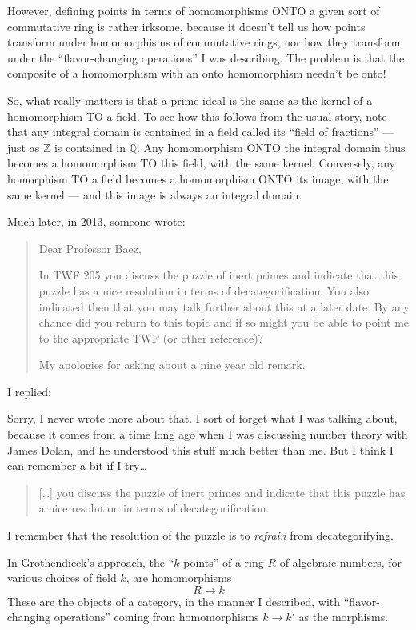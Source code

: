\documentclass{article}
\begin{document}
However, defining points in terms of homomorphisms ONTO a given sort of
commutative ring is rather irksome, because it doesn't tell us how
points transform under homomorphisms of commutative rings, nor how they
transform under the ``flavor-changing operations'' I was describing. The
problem is that the composite of a homomorphism with an onto
homomorphism needn't be onto!

So, what really matters is that a prime ideal is the same as the kernel
of a homomorphism TO a field. To see how this follows from the usual
story, note that any integral domain is contained in a field called its
``field of fractions'' --- just as \(\mathbb{Z}\) is contained in
\(\mathbb{Q}\). Any homomorphism ONTO the integral domain thus becomes a
homomorphism TO this field, with the same kernel. Conversely, any
homorphism TO a field becomes a homomorphism ONTO its image, with the
same kernel --- and this image is always an integral domain.

Much later, in 2013, someone wrote:

\begin{quote}
Dear Professor Baez,

In TWF 205 you discuss the puzzle of inert primes and indicate that this
puzzle has a nice resolution in terms of decategorification. You also
indicated then that you may talk further about this at a later date. By
any chance did you return to this topic and if so might you be able to
point me to the appropriate TWF (or other reference)?

My apologies for asking about a nine year old remark.
\end{quote}

I replied:

Sorry, I never wrote more about that. I sort of forget what I was
talking about, because it comes from a time long ago when I was
discussing number theory with James Dolan, and he understood this stuff
much better than me. But I think I can remember a bit if I try\ldots{}

\begin{quote}
{[}\ldots{]} you discuss the puzzle of inert primes and indicate that
this puzzle has a nice resolution in terms of decategorification.
\end{quote}

I remember that the resolution of the puzzle is to \emph{refrain} from
decategorifying.

In Grothendieck's approach, the ``\(k\)-points'' of a ring \(R\) of
algebraic numbers, for various choices of field \(k\), are homomorphisms
\[R \to k\] These are the objects of a category, in the manner I
described, with ``flavor-changing operations'' coming from homomorphisms
\(k \to k'\) as the morphisms.
\end{document}
